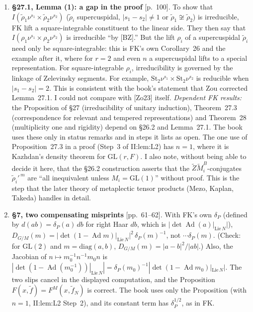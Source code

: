 \documentclass[12pt,letterpaper]{article}
\newcommand{\Ad}{\operatorname{Ad}}
\newcommand{\GL}{\mathrm{GL}}
\newcommand{\St}{\mathrm{St}}\newcommand{\vol}{\operatorname{vol}}
\newcommand{\loc}[1]{{\small\textsf{[#1]}}}
\begin{document}
\begin{enumerate}[label=\textbf{F\arabic*.},leftmargin=2.4em]
\item \textbf{\S27.1, Lemma (1): a gap in the proof} \loc{p.~100}. To show that $I(\tilde\rho_1\nu^{s_1}\times\tilde\rho_2\nu^{s_2})$ ($\tilde\rho_i$ supercuspidal, $|s_1-s_2|\ne1$ or $\tilde\rho_1\not\cong\tilde\rho_2$) is irreducible, FK lift a square-integrable constituent to the linear side. They then say that $I(\rho_1\nu^{s_1}\times\rho_2\nu^{s_2})$ is irreducible ``by [BZ].'' But the lift $\rho_i$ of a supercuspidal $\tilde\rho_i$ need only be square-integrable: this is FK's own Corollary~26 and the example after it, where for $r=2$ and even $n$ a supercuspidal lifts to a special representation. For square-integrable $\rho_i$, irreducibility is governed by the linkage of Zelevinsky segments. For example, $\St_2\nu^{s_1}\times\St_2\nu^{s_2}$ is reducible when $|s_1-s_2|=2$. This is consistent with the book's statement that Zou corrected Lemma~27.1. I could not compare with [Zo23] itself.
 \emph{Dependent FK results:} the Proposition of \S27 (irreducibility of unitary induction), Theorem~27.3 (correspondence for relevant and tempered representations) and Theorem~28 (multiplicity one and rigidity) depend on \S26.2 and Lemma~27.1. The book uses these only in status remarks and in steps it lists as open. The one use of Proposition~27.3 in a proof (Step~3 of II:lem:L2) has $n=1$, where it is Kazhdan's density theorem for $\GL(r,F)$.
 I also note, without being able to decide it here, that the \S26.2 construction asserts that the $\widetilde Z\widetilde M_i^B$-conjugates $\tilde\rho_i'^{\,m}$ are ``all inequivalent unless $M_i=\GL(1)$'' without proof. This is the step that the later theory of metaplectic tensor products (Mezo, Kaplan, Takeda) handles in detail.

\item \textbf{\S7, two compensating misprints} \loc{pp.~61--62}. With FK's own $\delta_P$ (defined by $d(ab)=\delta_P(a)\,db$ for right Haar $db$, which is $|\det\Ad(a)|_{\mathrm{Lie}\,N}|$), $D_{G/M}(m)=|\det(1-\Ad m)|_{\mathrm{Lie}\,N}|^2\,\delta_P(m)^{-1}$, not $\cdots\delta_P(m)$. (Check: for $\GL(2)$ and $m=\mathrm{diag}(a,b)$, $D_{G/M}(m)=|a-b|^2/|ab|$.) Also, the Jacobian of $n\mapsto m_0^{-1}n^{-1}m_0n$ is $|\det(1-\Ad(m_0^{-1}))|_{\mathrm{Lie}\,N}|=\delta_P(m_0)^{-1}|\det(1-\Ad m_0)|_{\mathrm{Lie}\,N}|$. The two slips cancel in the displayed computation, and the Proposition $F(x,\tilde f)=F^M(x,\tilde f_N)$ is correct. The book uses only the Proposition (with $n=1$, II:lem:L2 Step~2), and its constant term has $\delta_P^{1/2}$, as in FK.
\end{enumerate}
\end{document}
